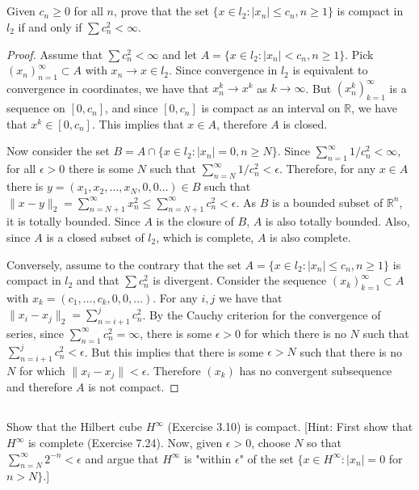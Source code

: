 \subsection{} Given $c_n \geq 0$ for all $n$, prove that the set $\{x \in l_2 : |x_n| \leq c_n, n \geq 1\}$ is compact in $l_2$ if and only if $\sum c_n^2 < \infty$.

\begin{proof}
Assume that $\sum c_n^2 < \infty$ and let $A = \{x \in l_2 : |x_n| < c_n, n \geq 1\}$. Pick $(x_n)_{n=1}^\infty \subset A$ with $x_n \rightarrow x \in l_2$. Since convergence in $l_2$ is equivalent to convergence in coordinates, we have that $x_n^k \rightarrow x^k$ as $k \rightarrow \infty$. But $(x_n^k)_{k=1}^\infty$ is a sequence on $[0,c_n]$, and since $[0,c_n]$ is compact as an interval on $\mathbb{R}$, we have that $x^k \in [0,c_n]$. This implies that $x \in A$, therefore $A$ is closed.


Now consider the set $B = A \cap \{x \in l_2: |x_n| = 0, n \geq N\}$. Since $\sum_{n=1}^\infty 1/c_n^2 < \infty$, for all $\epsilon > 0$ there is some $N$ such that $\sum_{n=N}^\infty 1/c_n^2 < \epsilon$. Therefore, for any $x \in A$ there is $y = (x_1, x_2, \dots, x_N, 0, 0 \dots) \in B$ such that $\|x - y\|_2 = \sum_{n=N+1}^\infty x_n^2 \leq \sum_{n=N+1}^\infty c_n^2 < \epsilon$. As $B$ is a bounded subset of $\mathbb{R}^n$, it is totally bounded. Since $A$ is the closure of $B$, $A$ is also totally bounded. Also, since $A$ is a closed subset of $l_2$, which is complete, $A$ is also complete.

\vspace{1em}

Conversely, assume to the contrary that the set $A=\{x \in l_2 : |x_n| \leq c_n, n \geq 1\}$ is compact in $l_2$ and that $\sum c_n^2$ is divergent. Consider the sequence $(x_k)_{k=1}^\infty \subset A$ with $x_k = (c_1, \dots, c_k, 0, 0, \dots)$. For any $i,j$ we have that $\|x_i - x_j\|_2 = \sum_{n=i+1}^j c_n^2$. By the Cauchy criterion for the convergence of series, since $\sum_{n=1}^\infty c_n^2 = \infty$, there is some $\epsilon > 0$ for which there is no $N$ such that $\sum_{n=i+1}^j c_n^2 < \epsilon$. But this implies that there is some $\epsilon>N$ such that there is no $N$ for which $\|x_i - x_j\|<\epsilon$. Therefore $(x_k)$ has no convergent subsequence and therefore $A$ is not compact. 

\end{proof}


\subsection{} Show that the Hilbert cube $H^\infty$ (Exercise 3.10) is compact. [Hint: First show that $H^\infty$ is complete (Exercise 7.24). Now, given $\epsilon > 0$, choose $N$ so that $\sum_{n=N}^\infty 2^{-n} < \epsilon$ and argue that $H^\infty$ is "within $\epsilon$" of the set $\{x \in H^\infty : |x_n| = 0$ for $n > N\}$.] 

